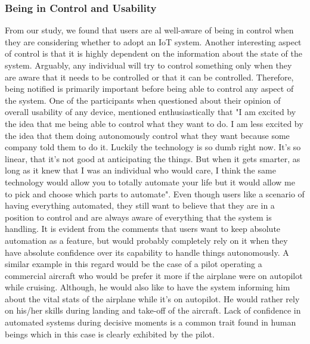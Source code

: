 \subsubsection{Being in Control and Usability}
From our study, we found that users are al well-aware of being in control when they are considering whether to adopt an IoT system. Another interesting aspect of control is that it is highly dependent on the information about the state of the system. Arguably, any individual will try to control something only when they are aware that it needs to be controlled or that it can be controlled. Therefore, being notified is primarily important before being able to control any aspect of the system. One of the participants when questioned about their opinion of overall usability of any device, mentioned enthusiastically that "I am excited by the idea that me being able to control what they want to do. I am less excited by the idea that them doing autonomously control what they want because some company told them to do it. Luckily the technology is so dumb right now. It's so linear, that it's not good at anticipating the things. But when it gets smarter, as long as it knew that I was an individual who would care, I think the same technology would allow you to totally automate your life but it would allow me to pick and choose which parts to automate". Even though users like a scenario of having everything automated, they still want to believe that they are in a position to control and are always aware of everything that the system is handling. It is evident from the comments that users want to keep absolute automation as a feature, but would probably completely rely on it when they have absolute confidence over its capability to handle things autonomously. A similar example in this regard would be the case of a pilot operating a commercial aircraft who would be prefer it more if the airplane were on autopilot while cruising. Although, he would also like to have the system informing him about the vital stats of the airplane while it's on autopilot. He would rather rely on his/her skills during landing and take-off of the aircraft. Lack of confidence in automated systems during decisive moments is a common trait found in human beings which in this case is clearly exhibited by the pilot.

